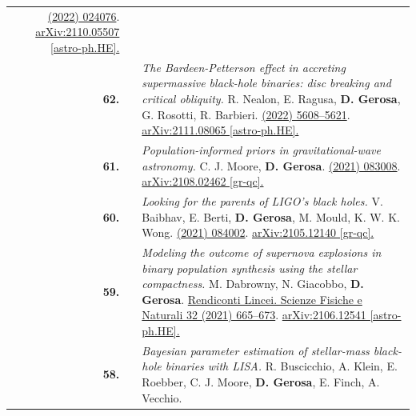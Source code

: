 {\begin{longtable}{rp{0.3cm}p{15.8cm}}
\href{https://journals.aps.org/prd/abstract/10.1103/PhysRevD.105.024076}{\prd 105 (2022) 024076}. \href{https://arxiv.org/abs/2110.05507}{arXiv:2110.05507 [astro-ph.HE].}
\vspace{0.09cm}\\
%
\textbf{62.} & & \textit{The Bardeen-Petterson effect in accreting supermassive black-hole binaries: disc breaking and critical obliquity.}
\newline{}
R. Nealon, E. Ragusa, \textbf{D. Gerosa}, G. Rosotti, R. Barbieri.
\newline{}
\href{https://doi.org/10.1093/mnras/stab3328}{\mnras 509 (2022) 5608–5621}. \href{https://arxiv.org/abs/2111.08065}{arXiv:2111.08065 [astro-ph.HE].}
\vspace{0.09cm}\\
%
\textbf{61.} & & \textit{Population-informed priors in gravitational-wave astronomy.}
\newline{}
C. J. Moore, \textbf{D. Gerosa}.
\newline{}
\href{https://journals.aps.org/prd/abstract/10.1103/PhysRevD.104.083008}{\prd 104 (2021) 083008}. \href{https://arxiv.org/abs/2108.02462}{arXiv:2108.02462 [gr-qc].}
\vspace{0.09cm}\\
%
\textbf{60.} & & \textit{Looking for the parents of LIGO's black holes.}
\newline{}
V. Baibhav, E. Berti, \textbf{D. Gerosa}, M. Mould, K. W. K. Wong.
\newline{}
\href{https://journals.aps.org/prd/abstract/10.1103/PhysRevD.104.084002}{\prd 104 (2021) 084002}. \href{https://arxiv.org/abs/2105.12140}{arXiv:2105.12140 [gr-qc].}
\vspace{0.09cm}\\
%
\textbf{59.} & & \textit{Modeling the outcome of supernova explosions in binary population synthesis using the stellar compactness.}
\newline{}
M. Dabrowny, N. Giacobbo, \textbf{D. Gerosa}.
\newline{}
\href{https://link.springer.com/article/10.1007/s12210-021-01019-8}{Rendiconti Lincei. Scienze Fisiche e Naturali 32 (2021) 665–673}. \href{https://arxiv.org/abs/2106.12541}{arXiv:2106.12541 [astro-ph.HE].}
\vspace{0.09cm}\\
%
\textbf{58.} & & \textit{Bayesian parameter estimation of stellar-mass black-hole binaries with LISA.}
\newline{}
R. Buscicchio, A. Klein, E. Roebber, C. J. Moore, \textbf{D. Gerosa}, E. Finch, A. Vecchio.

\end{longtable}}
